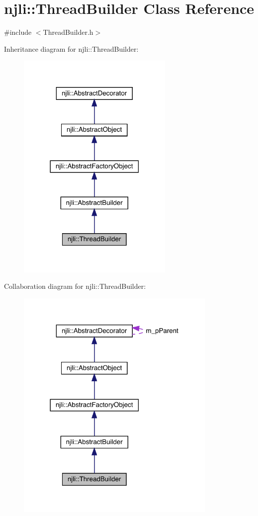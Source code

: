 \hypertarget{classnjli_1_1_thread_builder}{}\section{njli\+:\+:Thread\+Builder Class Reference}
\label{classnjli_1_1_thread_builder}


{\ttfamily \#include $<$Thread\+Builder.\+h$>$}



Inheritance diagram for njli\+:\+:Thread\+Builder\+:\nopagebreak
\begin{figure}[H]
\begin{center}
\leavevmode
\includegraphics[width=213pt]{classnjli_1_1_thread_builder__inherit__graph}
\end{center}
\end{figure}


Collaboration diagram for njli\+:\+:Thread\+Builder\+:\nopagebreak
\begin{figure}[H]
\begin{center}
\leavevmode
\includegraphics[width=273pt]{classnjli_1_1_thread_builder__coll__graph}
\end{center}
\end{figure}
